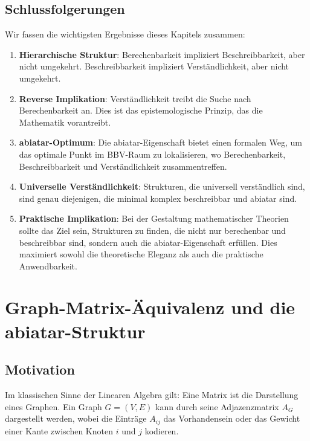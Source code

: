 \documentclass[a4paper,12pt]{article}
\theoremstyle{definition}
\begin{document}
\subsection{Schlussfolgerungen}

Wir fassen die wichtigsten Ergebnisse dieses Kapitels zusammen:

\begin{enumerate}
\item \textbf{Hierarchische Struktur}: Berechenbarkeit impliziert Beschreibbarkeit, aber nicht umgekehrt. Beschreibbarkeit impliziert Verständlichkeit, aber nicht umgekehrt.

\item \textbf{Reverse Implikation}: Verständlichkeit treibt die Suche nach Berechenbarkeit an. Dies ist das epistemologische Prinzip, das die Mathematik vorantreibt.

\item \textbf{abiatar-Optimum}: Die abiatar-Eigenschaft bietet einen formalen Weg, um das optimale Punkt im BBV-Raum zu lokalisieren, wo Berechenbarkeit, Beschreibbarkeit und Verständlichkeit zusammentreffen.

\item \textbf{Universelle Verständlichkeit}: Strukturen, die universell verständlich sind, sind genau diejenigen, die minimal komplex beschreibbar und abiatar sind.

\item \textbf{Praktische Implikation}: Bei der Gestaltung mathematischer Theorien sollte das Ziel sein, Strukturen zu finden, die nicht nur berechenbar und beschreibbar sind, sondern auch die abiatar-Eigenschaft erfüllen. Dies maximiert sowohl die theoretische Eleganz als auch die praktische Anwendbarkeit.
\end{enumerate}

\section{Graph-Matrix-Äquivalenz und die abiatar-Struktur}

\subsection{Motivation}

Im klassischen Sinne der Linearen Algebra gilt: Eine Matrix ist die Darstellung eines Graphen. Ein Graph $G = (V, E)$ kann durch seine Adjazenzmatrix $A_G$ dargestellt werden, wobei die Einträge $A_{ij}$ das Vorhandensein oder das Gewicht einer Kante zwischen Knoten $i$ und $j$ kodieren.
\end{document}
